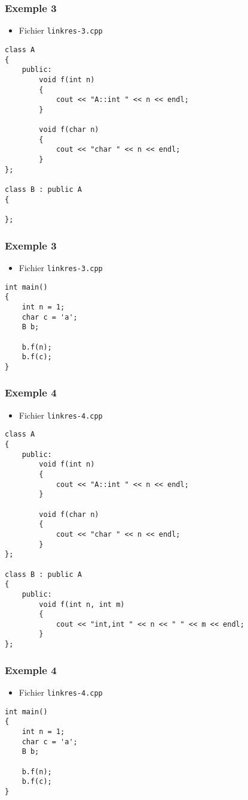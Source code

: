 \begin{frame}[containsverbatim]
\frametitle{Exemple 3}
\begin{itemize}
\item Fichier \texttt{linkres-3.cpp}
\end{itemize}
\begin{lstlisting}
class A
{
	public:
		void f(int n)
		{
			cout << "A::int " << n << endl;
		}

		void f(char n)
		{
			cout << "char " << n << endl;
		}
};

class B : public A
{
	
};
\end{lstlisting}
\end{frame}

\begin{frame}[containsverbatim]
\frametitle{Exemple 3}
\begin{itemize}
\item Fichier \texttt{linkres-3.cpp}
\end{itemize}
\begin{lstlisting}
int main()
{
	int n = 1;
	char c = 'a';
	B b;
	
	b.f(n);
	b.f(c);
}
\end{lstlisting}
\end{frame}

\begin{frame}[containsverbatim]
\frametitle{Exemple 4}
\begin{itemize}
\item Fichier \texttt{linkres-4.cpp}
\end{itemize}
\begin{lstlisting}
class A
{
	public:
		void f(int n)
		{
			cout << "A::int " << n << endl;
		}

		void f(char n)
		{
			cout << "char " << n << endl;
		}
};

class B : public A
{
	public:
		void f(int n, int m)
		{
			cout << "int,int " << n << " " << m << endl;
		}
};
\end{lstlisting}
\end{frame}

\begin{frame}[containsverbatim]
\frametitle{Exemple 4}
\begin{itemize}
\item Fichier \texttt{linkres-4.cpp}
\end{itemize}
\begin{lstlisting}
int main()
{
	int n = 1;
	char c = 'a';
	B b;
	
	b.f(n);
	b.f(c);
}
\end{lstlisting}
\end{frame}

